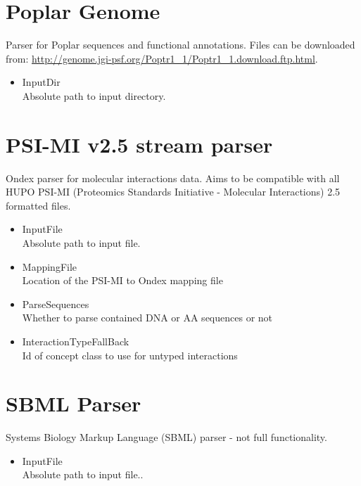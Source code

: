 \section{Poplar Genome}
Parser for Poplar sequences and functional annotations.   
Files can be downloaded from: \url{http://genome.jgi-psf.org/Poptr1_1/Poptr1_1.download.ftp.html}.
\begin{itemize}
  \item{InputDir}\\
  Absolute path to input directory. 
\end{itemize}
  
\section{PSI-MI v2.5 stream parser}
Ondex parser for molecular interactions data. Aims to be compatible with all 
HUPO PSI-MI (Proteomics Standards Initiative - Molecular Interactions) 2.5 formatted files.
\begin{itemize}
  \item{InputFile}\\
  Absolute path to input file.
  \item{MappingFile}\\
  Location of the PSI-MI to Ondex mapping file
  \item{ParseSequences}\\
  Whether to parse contained DNA or AA sequences or not
  \item{InteractionTypeFallBack}\\
  Id of concept class to use for untyped interactions
\end{itemize}
    
\section{SBML Parser}
Systems Biology Markup Language (SBML) parser - not full functionality.
\begin{itemize}
  \item{InputFile}\\
  Absolute path to input file.. 
\end{itemize}
    
